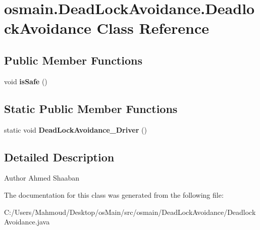 \hypertarget{classosmain_1_1_dead_lock_avoidance_1_1_deadlock_avoidance}{}\section{osmain.\+Dead\+Lock\+Avoidance.\+Deadlock\+Avoidance Class Reference}
\label{classosmain_1_1_dead_lock_avoidance_1_1_deadlock_avoidance}
\subsection*{Public Member Functions}
\begin{DoxyCompactItemize}
\item 
void {\bfseries is\+Safe} ()\hypertarget{classosmain_1_1_dead_lock_avoidance_1_1_deadlock_avoidance_a6b2da11406765c8723e21c54a8bdf560}{}\label{classosmain_1_1_dead_lock_avoidance_1_1_deadlock_avoidance_a6b2da11406765c8723e21c54a8bdf560}

\end{DoxyCompactItemize}
\subsection*{Static Public Member Functions}
\begin{DoxyCompactItemize}
\item 
static void {\bfseries Dead\+Lock\+Avoidance\+\_\+\+Driver} ()\hypertarget{classosmain_1_1_dead_lock_avoidance_1_1_deadlock_avoidance_ad60fb6dbcbc5a0895330f5cadd31fc6f}{}\label{classosmain_1_1_dead_lock_avoidance_1_1_deadlock_avoidance_ad60fb6dbcbc5a0895330f5cadd31fc6f}

\end{DoxyCompactItemize}


\subsection{Detailed Description}
\begin{DoxyAuthor}{Author}
Ahmed Shaaban 
\end{DoxyAuthor}


The documentation for this class was generated from the following file\+:\begin{DoxyCompactItemize}
\item 
C\+:/\+Users/\+Mahmoud/\+Desktop/os\+Main/src/osmain/\+Dead\+Lock\+Avoidance/Deadlock\+Avoidance.\+java\end{DoxyCompactItemize}
